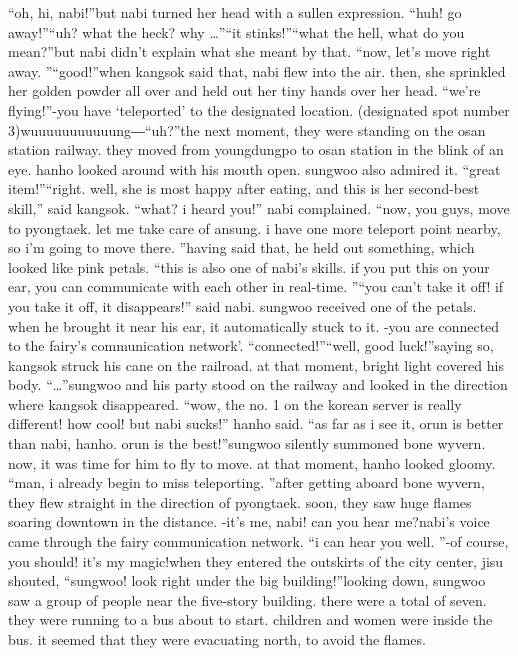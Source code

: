 “oh, hi, nabi!”but nabi turned her head with a sullen expression.
“huh! go away!”“uh? what the heck? why …”“it stinks!”“what the hell, what do you mean?”but nabi didn’t explain what she meant by that.
“now, let’s move right away.
”“good!”when kangsok said that, nabi flew into the air.
 then, she sprinkled her golden powder all over and held out her tiny hands over her head.
“we’re flying!”-you have ‘teleported’ to the designated location.
 (designated spot number 3)wuuuuuuuuuuung―“uh?”the next moment, they were standing on the osan station railway.
 they moved from youngdungpo to osan station in the blink of an eye.
hanho looked around with his mouth open.
 sungwoo also admired it.
“great item!”“right.
 well, she is most happy after eating, and this is her second-best skill,” said kangsok.
“what? i heard you!” nabi complained.
“now, you guys, move to pyongtaek.
 let me take care of ansung.
 i have one more teleport point nearby, so i’m going to move there.
”having said that, he held out something, which looked like pink petals.
“this is also one of nabi’s skills.
 if you put this on your ear, you can communicate with each other in real-time.
”“you can’t take it off! if you take it off, it disappears!” said nabi.
sungwoo received one of the petals.
 when he brought it near his ear, it automatically stuck to it.
-you are connected to the fairy’s communication network’.
“connected!”“well, good luck!”saying so, kangsok struck his cane on the railroad.
 at that moment, bright light covered his body.
“…”sungwoo and his party stood on the railway and looked in the direction where kangsok disappeared.
“wow, the no.
 1 on the korean server is really different! how cool! but nabi sucks!” hanho said.
“as far as i see it, orun is better than nabi, hanho.
 orun is the best!”sungwoo silently summoned bone wyvern.
 now, it was time for him to fly to move.
at that moment, hanho looked gloomy.
“man, i already begin to miss teleporting.
”after getting aboard bone wyvern, they flew straight in the direction of pyongtaek.
soon, they saw huge flames soaring downtown in the distance.
-it’s me, nabi! can you hear me?nabi’s voice came through the fairy communication network.
“i can hear you well.
”-of course, you should! it’s my magic!when they entered the outskirts of the city center, jisu shouted, “sungwoo! look right under the big building!”looking down, sungwoo saw a group of people near the five-story building.
 there were a total of seven.
 they were running to a bus about to start.
 children and women were inside the bus.
 it seemed that they were evacuating north, to avoid the flames.


